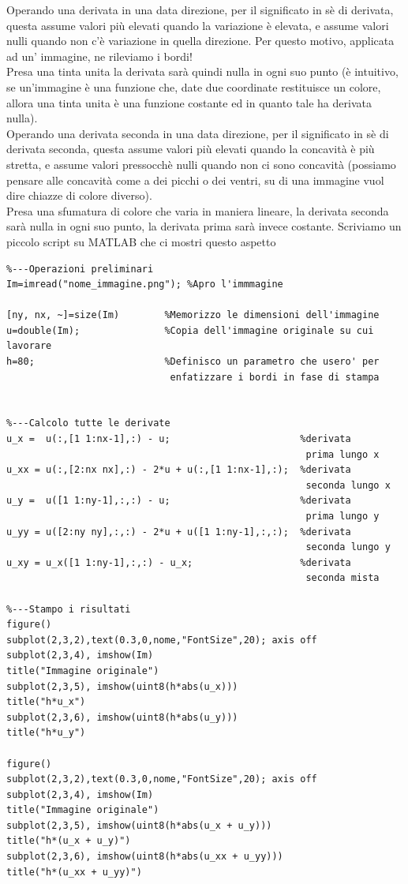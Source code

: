 Operando una derivata in una data direzione, per il significato in sè di derivata, questa assume valori più elevati quando la variazione è elevata, e assume valori nulli quando non c'è variazione in quella direzione. Per questo motivo, applicata ad un' immagine, ne rileviamo i bordi!\\
Presa una tinta unita la derivata sarà quindi nulla in ogni suo punto (è intuitivo, se un'immagine è una funzione che, date due coordinate restituisce un colore, allora una tinta unita è una funzione costante ed in quanto tale ha derivata nulla).\\
\vspace{1em}
Operando una derivata seconda in una data direzione, per il significato in sè di derivata seconda, questa assume valori più elevati quando la concavità è più stretta, e assume valori pressocchè nulli quando non ci sono concavità (possiamo pensare alle concavità come a dei picchi o dei ventri, su di una immagine vuol dire chiazze di colore diverso).\\
Presa una sfumatura di colore che varia in maniera lineare, la derivata seconda sarà nulla in ogni suo punto, la derivata prima sarà invece costante. 
Scriviamo un piccolo script su MATLAB che ci mostri questo aspetto

\begin{lstlisting}
%---Operazioni preliminari
Im=imread("nome_immagine.png");	%Apro l'immmagine

[ny, nx, ~]=size(Im)        %Memorizzo le dimensioni dell'immagine
u=double(Im);               %Copia dell'immagine originale su cui lavorare
h=80;                       %Definisco un parametro che usero' per 
                             enfatizzare i bordi in fase di stampa 


%---Calcolo tutte le derivate
u_x =  u(:,[1 1:nx-1],:) - u;                       %derivata 
                                                     prima lungo x
u_xx = u(:,[2:nx nx],:) - 2*u + u(:,[1 1:nx-1],:);  %derivata 
                                                     seconda lungo x
u_y =  u([1 1:ny-1],:,:) - u;                       %derivata
                                                     prima lungo y
u_yy = u([2:ny ny],:,:) - 2*u + u([1 1:ny-1],:,:);  %derivata 
                                                     seconda lungo y
u_xy = u_x([1 1:ny-1],:,:) - u_x;                   %derivata 
                                                     seconda mista
   
%---Stampo i risultati
figure()
subplot(2,3,2),text(0.3,0,nome,"FontSize",20); axis off
subplot(2,3,4), imshow(Im)
title("Immagine originale")
subplot(2,3,5), imshow(uint8(h*abs(u_x)))
title("h*u_x")
subplot(2,3,6), imshow(uint8(h*abs(u_y)))
title("h*u_y")

figure()
subplot(2,3,2),text(0.3,0,nome,"FontSize",20); axis off
subplot(2,3,4), imshow(Im)
title("Immagine originale")
subplot(2,3,5), imshow(uint8(h*abs(u_x + u_y)))
title("h*(u_x + u_y)")
subplot(2,3,6), imshow(uint8(h*abs(u_xx + u_yy)))
title("h*(u_xx + u_yy)")
\end{lstlisting}

